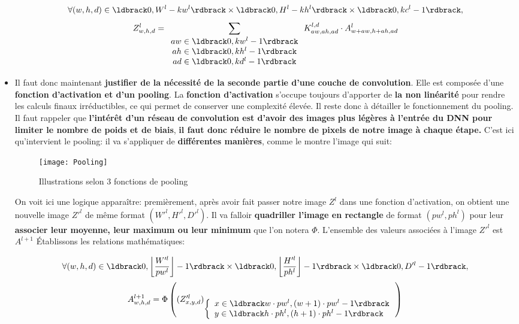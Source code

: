 \documentclass[12pt,a4paper]{extarticle}
\begin{document}
\begin{itemize}
\[ \forall (w,h,d)\in \ldbrack 0,W^l-kw^l\rdbrack \times \ldbrack 0, H^l-kh^l\rdbrack \times \ldbrack 0,kc^l-1 \rdbrack,\]
\begin{equation}
 Z^{l}_{w,h,d}= \sum_{\begin{array}{c} aw\in \ldbrack 0, kw^l-1\rdbrack \\ ah\in \ldbrack 0, kh^l-1\rdbrack \\ ad\in \ldbrack 0,kd^l-1 \rdbrack  \end{array}}K^{l,d}_{aw,ah,ad}\cdot A^l_{w+aw,h+ah,ad}
\label{CNN} 
\end{equation}
\item Il faut donc maintenant \textbf{justifier de la nécessité de la seconde partie d'une couche de convolution}. Elle est composée d'une \textbf{fonction d'activation et d'un pooling}. La \textbf{fonction d'activation} s'occupe toujours d'apporter de \textbf{la non linéarité} pour rendre les calculs finaux irréductibles, ce qui permet de conserver une complexité élevée. Il reste donc à détailler le fonctionnement du pooling. Il faut rappeler que \textbf{l'intérêt d'un réseau de convolution est d'avoir des images plus légères à l'entrée du DNN pour limiter le nombre de poids et de biais}, \textbf{il faut donc réduire le nombre de pixels de notre image à chaque étape.} C'est ici qu'intervient le pooling: il va s'appliquer de \textbf{différentes manières}, comme le montre l'image qui suit:  
\begin{figure}[h]
\centering
\texttt{[image: Pooling]}
\caption{Illustrations selon 3 fonctions de pooling}
\end{figure}
On voit ici une logique apparaître: premièrement, après avoir fait passer notre image $Z^l$ dans une fonction d'activation, on obtient une nouvelle image $Z'^l$ de même format $(W'^l,H'^l,D'^l)$. Il va falloir \textbf{quadriller l'image en rectangle }de format $(pw^l,ph^l)$ pour leur \textbf{associer leur moyenne, leur maximum ou leur minimum} que l'on notera $\Phi$. L'ensemble des valeurs associées à l'image $Z'^l$ est $A^{l+1}$
Établissons les relations mathématiques:

\[ \forall (w,h,d)\in \ldbrack 0,\left\lfloor \frac{W'^l}{pw^l} \right\rfloor -1 \rdbrack 
\times \ldbrack 0, \left\lfloor \frac{H'^l}{ph^l} \right\rfloor -1\rdbrack \times \ldbrack 0,D'^l-1 \rdbrack,\]
\begin{equation}
A^{l+1}_{w,h,d}=\Phi\left( ( Z'^l_{x,y,d})_{
\left\{\begin{array}{l}
x \in \ldbrack w\cdot pw^l, (w+1)\cdot pw^l-1 \rdbrack \\
y \in \ldbrack h\cdot ph^l, (h+1)\cdot ph^l-1 \rdbrack 
\end{array}\right.
}\right)
\end{equation}

\end{itemize}
\end{document}
